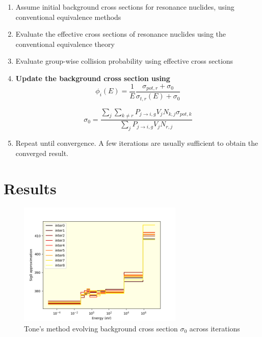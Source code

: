 \documentclass{beamer}
\begin{document}
    \begin{frame}
      \begin{enumerate}
        \item Assume initial background cross sections for resonance nuclides, using conventional equivalence methods
        \item Evaluate the effective cross sections of resonance nuclides using the conventional equivalence theory
        \item Evaluate group-wise collision probability using effective cross sections 
        \item \textbf{Update the background cross section using}
\begin{equation*}\phi_i(E)=\frac{1}{E}\frac{\sigma_{pot,r}+\sigma_{0}}{\sigma_{t,r}(E)+\sigma_{0}}\end{equation*}

\begin{equation*}\sigma_{0}=\frac{\sum\limits_j\sum\limits_{k\neq r}P_{j\rightarrow i,g}V_{j}N_{k,j}\sigma_{pot,k}}{\sum\limits_jP_{j\rightarrow i,g}V_{j}N_{r,j}}\end{equation*}


        \item Repeat until convergence. A few iterations are usually sufficient to obtain the converged result.
      \end{enumerate}
\end{frame}



\section{Results}
\begin{frame}
\begin{figure}
\includegraphics[width=0.7\textwidth]{sig0Estimations}
  \caption{Tone's method evolving background cross section $\sigma_0$ across iterations}
\end{figure}

\end{frame}
\end{document}

